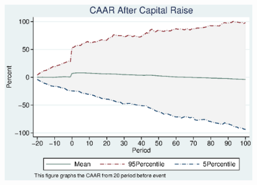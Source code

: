 \documentclass[12pt]{article}
\begin{document}
\begin{figure}
\centering
\includegraphics[width=0.7\linewidth]{95-5AbReturn.eps}
\caption{}
\label{fig:955abreturn}
\end{figure}
\end{document}
